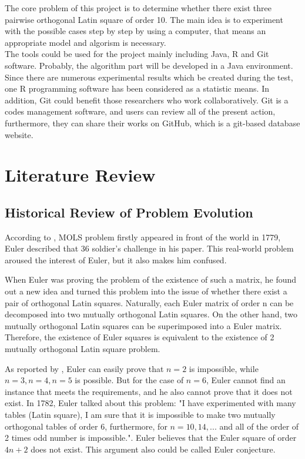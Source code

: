 \documentclass[12pt]{article}
\begin{document}
The core problem of this project is to determine whether there exist three pairwise orthogonal Latin square of order 10. The main idea is to experiment with the possible cases step by step by using a computer, that means an appropriate model and algorism is necessary. \\

The tools could be used for the project mainly including Java, R and Git software. Probably, the algorithm part will be developed in a Java environment. Since there are numerous experimental results which be created during the test, one R programming software has been considered as a statistic means. In addition, Git could benefit those researchers who work collaboratively. Git is a codes management software, and users can review all of the present action, furthermore, they can share their works on GitHub, which is a git-based database website.

\section{Literature Review}

\subsection{Historical Review of Problem Evolution} 

According to \cite{ref9}, MOLS problem firstly appeared in front of the world in 1779, Euler described that 36 soldier’s challenge in his paper. This real-world problem aroused the interest of Euler, but it also makes him confused. 

When Euler was proving the problem of the existence of such a matrix, he found out a new idea and turned this problem into the issue of whether there exist a pair of orthogonal Latin squares. Naturally, each Euler matrix of order n can be decomposed into two mutually orthogonal Latin squares. On the other hand, two mutually orthogonal Latin squares can be superimposed into a Euler matrix. Therefore, the existence of Euler squares is equivalent to the existence of 2 mutually orthogonal Latin square problem.

As reported by \cite{ref9}, Euler can easily prove that $n = 2$ is impossible, while $n = 3, n = 4, n = 5$ is possible. But for the case of $n = 6$, Euler cannot find an instance that meets the requirements, and he also cannot prove that it does not exist. In 1782, Euler talked about this problem: "I have experimented with many tables (Latin square), I am sure that it is impossible to make two mutually orthogonal tables of order 6, furthermore, for $n=10, 14, ...$ and all of the order of 2 times odd number is impossible.". Euler believes that the Euler square of order $4n + 2$ does not exist. This argument also could be called Euler conjecture.\\
\end{document}
